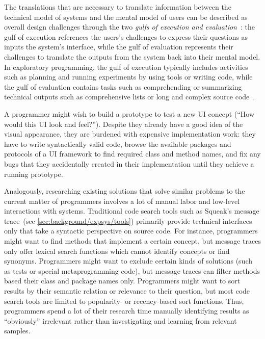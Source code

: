 The translations that are necessary to translate information between the technical model of systems and the mental model of users can be described as overall design challenges through the two \emph{gulfs of execution and evaluation}~\cite{norman1986cognitive}:
the gulf of execution references the users's challenges to express their questions as inputs the system's interface, while the gulf of evaluation represents their challenges to translate the outputs from the system back into their mental model.
In exploratory programming, the gulf of execution typically includes activities such as planning and running experiments by using tools or writing code, while the gulf of evaluation contains tasks such as comprehending or summarizing technical outputs such as comprehensive lists or long and complex source code~\cite{rein2020empirical}.

\begin{example}
	A programmer might wish to build a prototype to test a new UI concept (``How would this UI look and feel?'').
	Despite they already have a good idea of the visual appearance, they are burdened with expensive implementation work:
	they have to write syntactically valid code, browse the available packages and protocols of a UI framework to find required class and method names, and fix any bugs that they accidentally created in their implementation until they achieve a running prototype.

	Analogously, researching existing solutions that solve similar problems to the current matter of programmers involves a lot of manual labor and low-level interactions with systems.
	Traditional code search tools such as Squeak's message trace~(see \cref{sec:background/expsys/tools}) primarily provide technical interfaces only that take a syntactic perspective on source code.
	For instance, programmers might want to find methods that implement a certain concept, but message traces only offer lexical search functions which cannot identify concepts or find synonyms.
	Programmers might want to exclude certain kinds of solutions (such as tests or special metaprogramming code), but message traces can filter methods based their class and package names only.
	Programmers might want to sort results by their semantic relation or relevance to their question, but most code search tools are limited to popularity- or recency-based sort functions.
	Thus, programmers spend a lot of their research time manually identifying results as ``obviously'' irrelevant rather than investigating and learning from relevant samples.
\end{example}

